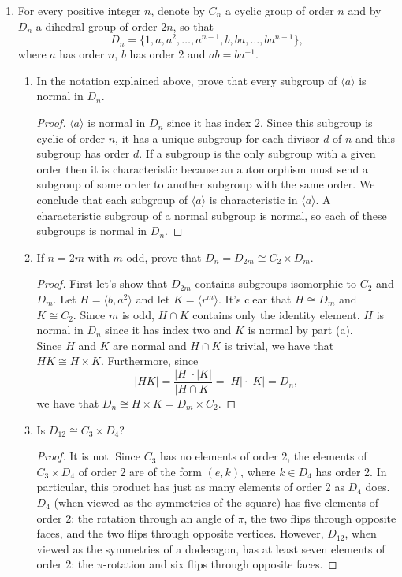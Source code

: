 \documentclass[11pt,letterpaper]{report}
\begin{document}
\begin{enumerate}
	\item For every positive integer $n$, denote by $C_n$ a cyclic group of order $n$ and by $D_n$ a dihedral group of order $2n$, so that
	\[
	D_n = \{1, a,a^2,\ldots, a^{n-1}, b, ba, \ldots, ba^{n-1} \},
	\]
	where $a$ has order $n$, $b$ has order 2 and $ab = ba^{-1}$.
	\begin{enumerate}
		\item In the notation explained above, prove that every subgroup of $\langle a\rangle$ is normal in $D_n$.
		\begin{proof}
			$\langle a \rangle$ is normal in $D_n$ since it has index 2. Since this subgroup is cyclic of order $n$, it has a unique subgroup for each divisor $d$ of $n$ and this subgroup has order $d$. If a subgroup is the only subgroup with a given order then it is characteristic because an automorphism must send a subgroup of some order to another subgroup with the same order. We conclude that each subgroup of $\langle a \rangle$ is characteristic in $\langle a \rangle$. A characteristic subgroup of a normal subgroup is normal, so each of these subgroups is normal in $D_n$.
		\end{proof}
		\item If $n = 2m$ with $m$ odd, prove that $D_n = D_{2m} \cong C_2\times D_m$.
		\begin{proof}
			First let's show that $D_{2m}$ contains subgroups isomorphic to $C_2$ and $D_m$. Let $H = \langle b, a^2\rangle$ and let $K = \langle r^m\rangle$. It's clear that $H\cong D_m$ and $K\cong C_2$. Since $m$ is odd, $H\cap K$ contains only the identity element. $H$ is normal in $D_n$ since it has index two and $K$ is normal by part (a).\\

			\noindent Since $H$ and $K$ are normal and $H\cap K$ is trivial, we have that $HK \cong H\times K$. Furthermore, since
			\[
			|HK| = \frac{|H|\cdot |K|}{|H\cap K|} = |H|\cdot |K| = D_n,
			\]
			we have that $D_n \cong H\times K = D_m\times C_2$.
		\end{proof}
		\item Is $D_{12}\cong C_3\times D_4$?
		\begin{proof}
			It is not. Since $C_3$ has no elements of order 2, the elements of $C_3\times D_4$ of order 2 are of the form $(e,k)$, where $k\in D_4$ has order 2. In particular, this product has just as many elements of order 2 as $D_4$ does. $D_4$ (when viewed as the symmetries of the square) has five elements of order 2: the rotation through an angle of $\pi$, the two flips through opposite faces, and the two flips through opposite vertices. However, $D_{12}$, when viewed as the symmetries of a dodecagon, has at least seven elements of order 2: the $\pi$-rotation and six flips through opposite faces.
		\end{proof}
	\end{enumerate}


\end{enumerate}
\end{document}
